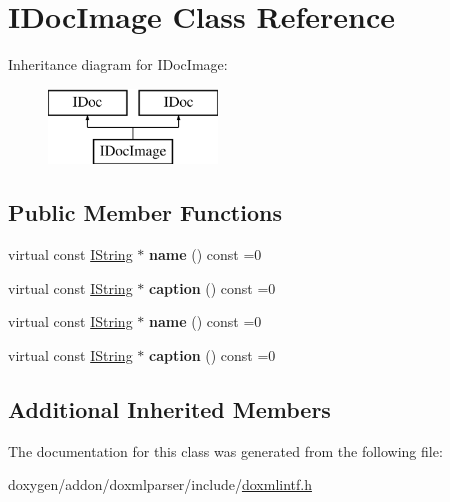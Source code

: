 \hypertarget{class_i_doc_image}{}\section{I\+Doc\+Image Class Reference}
\label{class_i_doc_image}
Inheritance diagram for I\+Doc\+Image\+:\begin{figure}[H]
\begin{center}
\leavevmode
\includegraphics[height=2.000000cm]{class_i_doc_image}
\end{center}
\end{figure}
\subsection*{Public Member Functions}
\begin{DoxyCompactItemize}
\item 
\mbox{\label{class_i_doc_image_a27a2b41495c4a1036c0b3704b0e6b9ad}} 
virtual const \mbox{\hyperlink{class_i_string}{I\+String}} $\ast$ {\bfseries name} () const =0
\item 
\mbox{\label{class_i_doc_image_a045f85daefc6d9539adeea5c7dfdcfc2}} 
virtual const \mbox{\hyperlink{class_i_string}{I\+String}} $\ast$ {\bfseries caption} () const =0
\item 
\mbox{\label{class_i_doc_image_a27a2b41495c4a1036c0b3704b0e6b9ad}} 
virtual const \mbox{\hyperlink{class_i_string}{I\+String}} $\ast$ {\bfseries name} () const =0
\item 
\mbox{\label{class_i_doc_image_a045f85daefc6d9539adeea5c7dfdcfc2}} 
virtual const \mbox{\hyperlink{class_i_string}{I\+String}} $\ast$ {\bfseries caption} () const =0
\end{DoxyCompactItemize}
\subsection*{Additional Inherited Members}


The documentation for this class was generated from the following file\+:\begin{DoxyCompactItemize}
\item 
doxygen/addon/doxmlparser/include/\mbox{\hyperlink{include_2doxmlintf_8h}{doxmlintf.\+h}}\end{DoxyCompactItemize}

